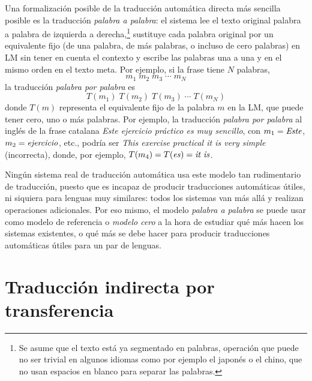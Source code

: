 \label{pg:mpm} Una formalización posible de la traducción automática directa más sencilla posible es la traducción \emph{palabra a palabra}: el sistema lee el texto original palabra a palabra de izquierda a derecha,\footnote{Se asume que el texto está ya segmentado en palabras, operación que puede no ser trivial en algunos idiomas como por ejemplo el japonés o el chino, que no usan espacios en blanco para separar las palabras.} sustituye cada palabra original por un equivalente fijo (de una palabra, de más palabras, o incluso de cero palabras) en LM sin tener en cuenta el contexto y escribe las palabras una a una y en el mismo orden en el texto meta. Por ejemplo, si la frase tiene \(N\) palabras, \begin{displaymath} m_1\; m_2\; m_3\; \cdots \;m_N \end{displaymath} la traducción \emph{palabra por palabra} es \begin{displaymath} T(m_1)\; T(m_2)\; T(m_3)\; \cdots\; T(m_N) \end{displaymath} donde \(T(m)\) representa el equivalente fijo de la palabra \(m\) en la LM, que puede tener cero, uno o más palabras. Por ejemplo, la traducción \emph{palabra por palabra} al inglés de la frase catalana \emph{Este ejercicio práctico es muy sencillo}, con \(m_1=\mbox{\emph{Este}}\), \(m_2=\mbox{\emph{ejercicio}}\), etc., podría ser \emph{This exercise practical it is very simple} (incorrecta), donde, por ejemplo, \(T(m_4)=T(\mbox{\emph{es}})=\mbox{\emph{it is}}\). 

Ningún sistema real de traducción automática usa este modelo tan rudimentario de traducción, puesto que es incapaz de producir traducciones automáticas útiles, ni siquiera para lenguas muy similares: todos los sistemas van más allá y realizan operaciones adicionales. Por eso mismo, el modelo \emph{palabra a palabra} se puede usar como modelo de referencia o \emph{modelo cero} a la hora de estudiar qué más hacen los sistemas existentes, o qué más se debe hacer para producir traducciones automáticas útiles para un par de lenguas. 

\section{Traducción indirecta por transferencia} \label{ss:classtrans} 

